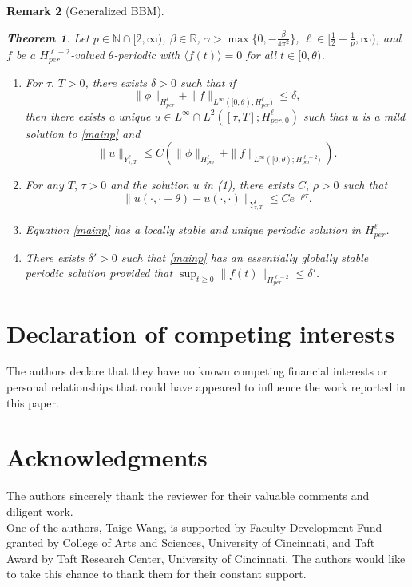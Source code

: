 \documentclass[10pt,a4paper,final]{article}
\numberwithin{equation}{section}
\newcommand{\ds}{\displaystyle}
\newtheorem{theorem}{Theorem}[section]
\newtheorem{remark}[theorem]{Remark}
\newcommand{\lan}{\langle}
\newcommand{\ran}{\rangle}
\newcommand{\R}{\mathbb{R}}
\newcommand{\N}{\mathbb{N}}
\newcommand{\Gb}{\beta}
\newcommand{\Gd}{\delta}
\newcommand{\Gg}{\gamma}
\newcommand{\Gth}{\theta}
\begin{document}
\begin{remark}[Generalized BBM]
    \begin{theorem}
        Let $p\in \N\cap[2,\infty)$, $\Gb\in \R$, $\Gg>\max\{0,-\frac{\beta}{4\pi^2}\}$, $\ell\in [\frac{1}{2}-\frac{1}{p},\infty)$, and $f$ be a $H^{\ell-2}_{per}$-valued $\Gth$-periodic with $\lan f(t)\ran=0$ for all $t\in [0,\Gth)$.
        \begin{enumerate}
            \item For $\tau,\, T>0$, there exists $\delta>0$ such that if  $$\|\phi\|_{H^{\ell}_{per}}+\|f\|_{L^{\infty}([0,\Gth);H^{\ell}_{per})}\leq \delta,$$ then there exists a unique $u\in L^{\infty}\cap L^2([\tau,T];H^\ell_{per,0})$ such that $u$ is a mild solution to \eqref{mainp} and  
    $$\|u\|_{Y^{\ell}_{\tau,T}}\leq C(\|\phi\|_{H^{\ell}_{per}}+\|f\|_{L^{\infty}([0,\Gth);H^{\ell-2}_{per})}). $$ 
    \item For any $T,\,\tau>0$ and the solution $u$ in (1), there exists $C,\,\rho>0$ such that 
    $$\|u(\cdot, \cdot+\theta)-u(\cdot, \cdot)\|_{Y^{\ell}_{\tau,T}}\leq C e^{-\rho \tau}.$$
    \item Equation \eqref{mainp} has a locally stable and unique periodic solution in $H^{\ell}_{per}$.
    \item There exists $\Gd'>0$ such that \eqref{mainp} has an essentially globally stable periodic solution provided that $\ds \sup_{t\geq 0}\|f(t)\|_{H^{\ell-2}_{per}}\leq \Gd'$.
        \end{enumerate}
    \end{theorem}
\end{remark}

\section*{Declaration of competing interests}
The authors declare that they have no known competing financial interests or personal relationships that could have appeared to influence the work reported in this paper.


\section*{Acknowledgments}
The authors sincerely thank the reviewer for their valuable comments and diligent work. \\

\noindent One of the authors, Taige Wang, is supported by Faculty Development Fund granted by College of Arts and Sciences, University of Cincinnati, and Taft Award by Taft Research Center, University of Cincinnati. The authors would like to take this chance to thank them for their constant support. 
\end{document}
